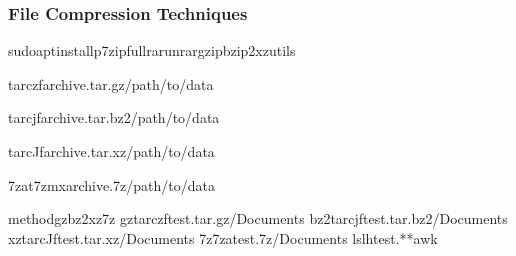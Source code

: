 \documentclass[letterpaper,10pt,english]{sphinxmanual}
\begin{document}
\subsubsection{File Compression Techniques}
\label{\detokenize{data-organization:file-compression-techniques}}
\begin{sphinxVerbatim}[commandchars=\\\{\}]
sudoaptinstallp7zip\PYGZhy{}fullrarunrargzipbzip2xz\PYGZhy{}utils

tar\PYGZhy{}czfarchive.tar.gz/path/to/data

tar\PYGZhy{}cjfarchive.tar.bz2/path/to/data

tar\PYGZhy{}cJfarchive.tar.xz/path/to/data

7za\PYGZhy{}t7z\PYGZhy{}mxarchive.7z/path/to/data

methodgzbz2xz7z
gztar\PYGZhy{}czftest.tar.gz\PYGZti{}/Documents
bz2tar\PYGZhy{}cjftest.tar.bz2\PYGZti{}/Documents
xztar\PYGZhy{}cJftest.tar.xz\PYGZti{}/Documents
7z7zatest.7z\PYGZti{}/Documents
ls\PYGZhy{}lhtest.**awk
\end{sphinxVerbatim}
\end{document}
